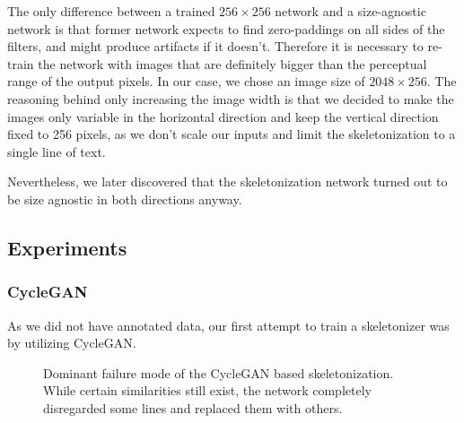 The only difference between a trained $256\times256$ network and a size-agnostic network is that former network expects to find zero-paddings on all sides of the filters, and might produce artifacts if it doesn't. Therefore it is necessary to re-train the network with images that are definitely bigger than the perceptual range of the output pixels. In our case, we chose an image size of $2048\times256$. The reasoning behind only increasing the image width is that we decided to make the images only variable in the horizontal direction and keep the vertical direction fixed to 256 pixels, as we don't scale our inputs and limit the skeletonization to a single line of text.

Nevertheless, we later discovered that the skeletonization network turned out to be size agnostic in both directions anyway.



\subsection{Experiments}
\subsubsection{CycleGAN}

As we did not have annotated data, our first attempt to train a skeletonizer was by utilizing \gls{CycleGAN}.

\begin{figure}
  \centering
  \caption[Dominant failure mode of the CycleGAN based skeleteonization]{Dominant failure mode of the \gls{CycleGAN} based skeletonization. While certain similarities still exist, the network completely disregarded some lines and replaced them with others.}
  \label{fig:cycleGanFail}
\end{figure}

